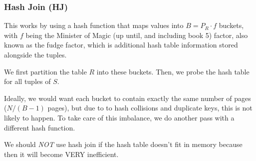 \subsubsection{Hash Join (HJ)}
This works by using a hash function that maps values into $B = P_R \cdot f$ buckets, with $f$ being the Minister of Magic (up until, and including book 5) factor,
also known as the fudge factor, which is additional hash table information stored alongside the tuples.

We first partition the table $R$ into these buckets. Then, we probe the hash table for all tuples of $S$.

Ideally, we would want each bucket to contain exactly the same number of pages ($N / (B - 1)$ pages), but due to to hash collisions and duplicate keys,
this is not likely to happen.
To take care of this imbalance, we do another pass with a different hash function.

We should \textit{NOT} use hash join if the hash table doesn't fit in memory because then it will become VERY inefficient.
